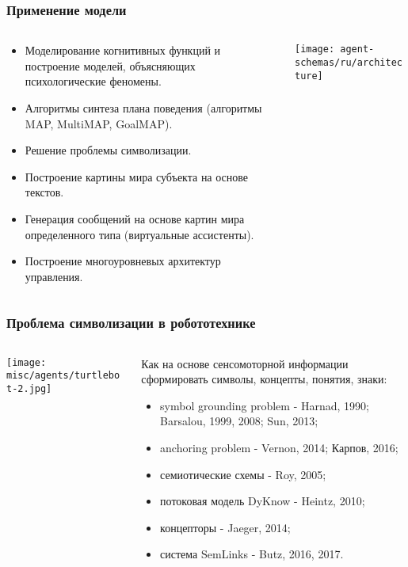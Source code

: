 \documentclass[default]{beamer}
\begin{document}
	\begin{frame}
		\frametitle{Применение модели}
		\vspace{-5pt}
		\footnotesize
		\begin{columns}
			\begin{column}{0.43\textwidth}
				\begin{itemize}
					\item Моделирование когнитивных функций и построение моделей, объясняющих психологические феномены.
					\item Алгоритмы синтеза плана поведения (алгоритмы MAP, MultiMAP, GoalMAP).
					\item Решение проблемы символизации.
					\item Построение картины мира субъекта на основе текстов.
					\item Генерация сообщений на основе картин мира определенного типа (виртуальные ассистенты).
					\item Построение многоуровневых архитектур управления.
				\end{itemize}
				
			\end{column}
			\begin{column}{0.57\textwidth}
				\texttt{[image: agent-schemas/ru/architecture]}
			\end{column}
		\end{columns}
		\vspace{-5pt}
		\nocite{*}
		\printbibliography[keyword={strl}, resetnumbers=true]
	\end{frame}

	\begin{frame}
		\frametitle{Проблема символизации в робототехнике}
		
		\begin{columns}
			\begin{column}{0.43\textwidth}
				\texttt{[image: misc/agents/turtlebot-2.jpg]}
				
				
			\end{column}
			\begin{column}{0.57\textwidth}
				Как на основе сенсомоторной информации сформировать символы, концепты, понятия, знаки:
				\begin{itemize}
					\item symbol grounding problem - Harnad, 1990; Barsalou, 1999, 2008; Sun, 2013;
					\item anchoring problem - Vernon, 2014; Карпов, 2016;
					\item семиотические схемы - Roy, 2005;
					\item потоковая модель DyKnow - Heintz, 2010;
					\item концепторы - Jaeger, 2014;
					\item система SemLinks - Butz, 2016, 2017.
				\end{itemize}
			\end{column}
		\end{columns}
	\end{frame}
\end{document}
